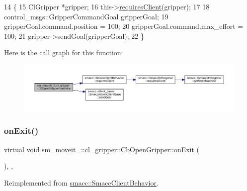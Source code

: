 \begin{DoxyCode}
14     \{
15         ClGripper *gripper;
16         this->\hyperlink{classsmacc_1_1ISmaccClientBehavior_a32b16e99e3b4cb289414203dc861a440}{requiresClient}(gripper);
17 
18         control\_msgs::GripperCommandGoal gripperGoal;
19         gripperGoal.command.position = 100;
20         gripperGoal.command.max\_effort = 100;
21         gripper->sendGoal(gripperGoal);
22     \}
\end{DoxyCode}
Here is the call graph for this function\+:
\nopagebreak
\begin{figure}[H]
\begin{center}
\leavevmode
\includegraphics[width=350pt]{classsm__moveit__2_1_1cl__gripper_1_1CbOpenGripper_aaa18f60580c10e891b572f61f85ffb05_cgraph}
\end{center}
\end{figure}
\mbox{\label{classsm__moveit__2_1_1cl__gripper_1_1CbOpenGripper_ab72fa9429628aa78b2bb1276ff7d390a}} 
\subsubsection{\texorpdfstring{on\+Exit()}{onExit()}}
{\footnotesize\ttfamily virtual void sm\+\_\+moveit\+\_\+::cl\+\_\+gripper\+::\+Cb\+Open\+Gripper\+::on\+Exit (\begin{DoxyParamCaption}{ }\end{DoxyParamCaption})\hspace{0.3cm}{\ttfamily [inline]}, {\ttfamily [override]}, {\ttfamily [virtual]}}



Reimplemented from \hyperlink{classsmacc_1_1SmaccClientBehavior_a7e4fb6ce81ff96dc172425852d69c0c5}{smacc\+::\+Smacc\+Client\+Behavior}.



